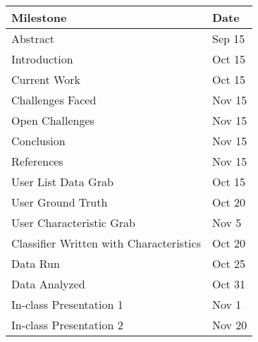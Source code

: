 \begin{table} [h]
\centering
    \begin{tabular}{|l|l|}
    \hline
    Milestone                               & Date    \\ \hline
    Abstract                                & Sep 15 \\
    Introduction                            & Oct 15  \\
    Current Work                            & Oct 15  \\
    Challenges Faced                        & Nov 15  \\
    Open Challenges                         & Nov 15  \\
    Conclusion                              & Nov 15  \\
    References                              & Nov 15  \\
    User List Data Grab                     & Oct 15  \\
    User Ground Truth                       & Oct 20  \\
    User Characteristic Grab                & Nov 5   \\
    Classifier Written with Characteristics & Oct 20  \\
    Data Run                                & Oct 25  \\
    Data Analyzed                           & Oct 31  \\
    In-class Presentation 1                 & Nov 1   \\
    In-class Presentation 2                 & Nov 20  \\ \hline
    \end{tabular}
\end{table}